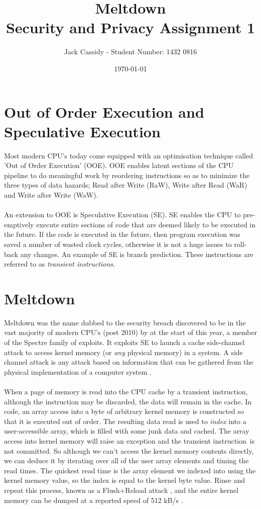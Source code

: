 \documentclass[12pt]{article}
\def\ti{transient instruction}
\begin{document}
\title{ Meltdown \\
	\large Security and Privacy Assignment 1}
\author{Jack Cassidy - Student Number: 1432 0816}
\date{\today}
\maketitle

\section{Out of Order Execution and Speculative Execution}
Most modern CPU's today come equipped with an optimisation technique called 'Out of Order Execution'
(OOE). OOE enables latent sections of the CPU pipeline to do meaningful work by reordering
instructions so as to minimize the three types of data hazards; Read after Write (RaW), Write after
Read (WaR) and Write after Write (WaW). \paragraph{} An extension to OOE is Speculative Execution
(SE). SE enables the CPU to pre-emptively execute entire sections of code that are deemed likely to
be executed in the future. If the code is executed in the future, then program execution was saved a
number of wasted clock cycles, otherwise it is not a huge issues to roll-back any changes. An
example of SE is branch prediction. These instructions are referred to as \textit{transient
instructions}.
\section{Meltdown}
Meltdown was the name dubbed to the security breach discovered to be in the vast majority of modern
CPU's (post 2010) by \cite{Lipp2018meltdown} at the start of this year, a member of the Spectre
family of exploits. It exploits SE to launch a cache side-channel attack to access kernel memory (or
\textit{any} physical memory) in a system. A side channel attack is any attack based on information
that can be gathered from the physical implementation of a computer system \cite{wiki:side}.
\paragraph{} When a page of memory is read into the CPU cache by a \ti, although the instruction may
be discarded, the data will remain in the cache. In code, an array access into a byte of arbitrary
kernel memory is constructed so that it is executed out of order. The resulting data read is used to
\textit{index} into a user-accessible array, which is filled with some junk data and cached. The
array access into kernel memory will raise an exception and the \ti ~is not committed. So although we
can't access the kernel memory contents directly, we can deduce it by iterating over all of the user
array elements and timing the read times. The quickest read time is the array element we indexed
into using the kernel memory value, so the index is equal to the kernel byte value. Rinse and repeat
this process, known as a Flush+Reload attack \cite{flush}, and the entire kernel memory can be
dumped at a reported speed of 512 kB/s \cite{Lipp2018meltdown}.
\end{document}
